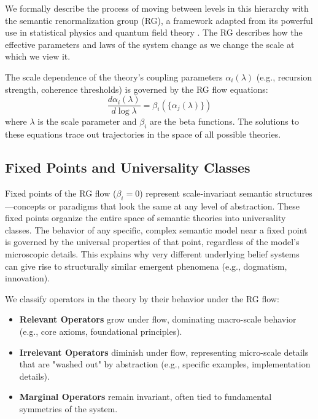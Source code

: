 We formally describe the process of moving between levels in this hierarchy with the semantic renormalization group (RG), a framework adapted from its powerful use in statistical physics and quantum field theory \autocite{Wilson1971, Cardy1996}. The RG describes how the effective parameters and laws of the system change as we change the scale at which we view it.

The scale dependence of the theory's coupling parameters \(\alpha_i(\lambda)\) (e.g., recursion strength, coherence thresholds) is governed by the RG flow equations:
\begin{equation}
\frac{d\alpha_i(\lambda)}{d\log\lambda} = \beta_i(\{\alpha_j(\lambda)\})
\end{equation}
where \(\lambda\) is the scale parameter and \(\beta_i\) are the beta functions. The solutions to these equations trace out trajectories in the space of all possible theories.


\subsection{Fixed Points and Universality Classes}

Fixed points of the RG flow (\(\beta_i = 0\)) represent scale-invariant semantic structures—concepts or paradigms that look the same at any level of abstraction. These fixed points organize the entire space of semantic theories into universality classes. The behavior of any specific, complex semantic model near a fixed point is governed by the universal properties of that point, regardless of the model's microscopic details. This explains why very different underlying belief systems can give rise to structurally similar emergent phenomena (e.g., dogmatism, innovation).

We classify operators in the theory by their behavior under the RG flow:
\begin{itemize}
    \item \textbf{Relevant Operators} grow under flow, dominating macro-scale behavior (e.g., core axioms, foundational principles).
    \item \textbf{Irrelevant Operators} diminish under flow, representing micro-scale details that are "washed out" by abstraction (e.g., specific examples, implementation details).
    \item \textbf{Marginal Operators} remain invariant, often tied to fundamental symmetries of the system.
\end{itemize}

